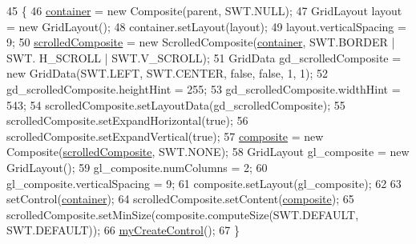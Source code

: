 \begin{DoxyCode}
45                                                 \{
46         \hyperlink{classit_1_1isislab_1_1masonassisteddocumentation_1_1mason_1_1wizards_1_1_f___agent_variables_page_a69defe28748ba6ba72b8c09e3b213245}{container} = \textcolor{keyword}{new} Composite(parent, SWT.NULL);
47         GridLayout layout = \textcolor{keyword}{new} GridLayout();
48         container.setLayout(layout);
49         layout.verticalSpacing = 9;     
50         \hyperlink{classit_1_1isislab_1_1masonassisteddocumentation_1_1mason_1_1wizards_1_1_f___agent_variables_page_af1e4ae0be128f9bae8b445938b59fd9c}{scrolledComposite} = \textcolor{keyword}{new} ScrolledComposite(\hyperlink{classit_1_1isislab_1_1masonassisteddocumentation_1_1mason_1_1wizards_1_1_f___agent_variables_page_a69defe28748ba6ba72b8c09e3b213245}{container}, SWT.BORDER | SWT.
      H\_SCROLL | SWT.V\_SCROLL);
51         GridData gd\_scrolledComposite = \textcolor{keyword}{new} GridData(SWT.LEFT, SWT.CENTER, \textcolor{keyword}{false}, \textcolor{keyword}{false}, 1, 1);
52         gd\_scrolledComposite.heightHint = 255;
53         gd\_scrolledComposite.widthHint = 543;
54         scrolledComposite.setLayoutData(gd\_scrolledComposite);
55         scrolledComposite.setExpandHorizontal(\textcolor{keyword}{true});
56         scrolledComposite.setExpandVertical(\textcolor{keyword}{true});      
57         \hyperlink{classit_1_1isislab_1_1masonassisteddocumentation_1_1mason_1_1wizards_1_1_f___agent_variables_page_ae1c0cb2824f39253ba724603c4ba6920}{composite} = \textcolor{keyword}{new} Composite(\hyperlink{classit_1_1isislab_1_1masonassisteddocumentation_1_1mason_1_1wizards_1_1_f___agent_variables_page_af1e4ae0be128f9bae8b445938b59fd9c}{scrolledComposite}, SWT.NONE);
58         GridLayout gl\_composite = \textcolor{keyword}{new} GridLayout();
59         gl\_composite.numColumns = 2;
60         gl\_composite.verticalSpacing = 9;
61         composite.setLayout(gl\_composite);      
62         
63         setControl(\hyperlink{classit_1_1isislab_1_1masonassisteddocumentation_1_1mason_1_1wizards_1_1_f___agent_variables_page_a69defe28748ba6ba72b8c09e3b213245}{container});
64         scrolledComposite.setContent(\hyperlink{classit_1_1isislab_1_1masonassisteddocumentation_1_1mason_1_1wizards_1_1_f___agent_variables_page_ae1c0cb2824f39253ba724603c4ba6920}{composite});
65         scrolledComposite.setMinSize(composite.computeSize(SWT.DEFAULT, SWT.DEFAULT));      
66         \hyperlink{classit_1_1isislab_1_1masonassisteddocumentation_1_1mason_1_1wizards_1_1_f___agent_variables_page_a275d67efa29411a7afc3ee12531b4f3b}{myCreateControl}();
67     \}
\end{DoxyCode}


